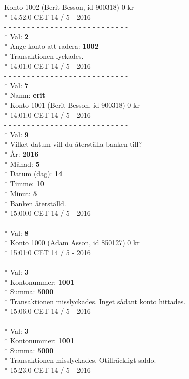 \begin{multicols}{2}
Konto 1002 (Berit Besson, id 900318) 0 kr\\*
14:52:0 CET 14 / 5 - 2016\\
- - - - - - - - - - - - - - - - - - - - - - - - - - -\\*
Val: \textbf{2}\\*
Ange konto att radera: \textbf{1002}\\*
Transaktionen lyckades.\\*
14:01:0 CET 14 / 5 - 2016\\
- - - - - - - - - - - - - - - - - - - - - - - - - - -\\*
Val: \textbf{7}\\*
Namn: \textbf{erit}\\*
Konto 1001 (Berit Besson, id 900318) 0 kr\\*
14:01:0 CET 14 / 5 - 2016\\
- - - - - - - - - - - - - - - - - - - - - - - - - - -\\*
Val: \textbf{9}\\*
Vilket datum vill du återställa banken till?\\*
År: \textbf{2016}\\*
Månad: \textbf{5}\\*
Datum (dag): \textbf{14}\\*
Timme: \textbf{10}\\*
Minut: \textbf{5}\\*
Banken återställd.\\*
15:00:0 CET 14 / 5 - 2016\\
- - - - - - - - - - - - - - - - - - - - - - - - - - -\\*
Val: \textbf{8}\\*
Konto 1000 (Adam Asson, id 850127) 0 kr\\*
15:01:0 CET 14 / 5 - 2016\\
- - - - - - - - - - - - - - - - - - - - - - - - - - -\\*
Val: \textbf{3}\\*
Kontonummer: \textbf{1001}\\*
Summa: \textbf{5000}\\*
Transaktionen misslyckades. Inget sådant konto hittades.\\*
15:06:0 CET 14 / 5 - 2016\\
- - - - - - - - - - - - - - - - - - - - - - - - - - -\\*
Val: \textbf{3}\\*
Kontonummer: \textbf{1001}\\*
Summa: \textbf{5000}\\*
Transaktionen misslyckades.  Otillräckligt saldo.\\*
15:23:0 CET 14 / 5 - 2016\\
\end{multicols}
